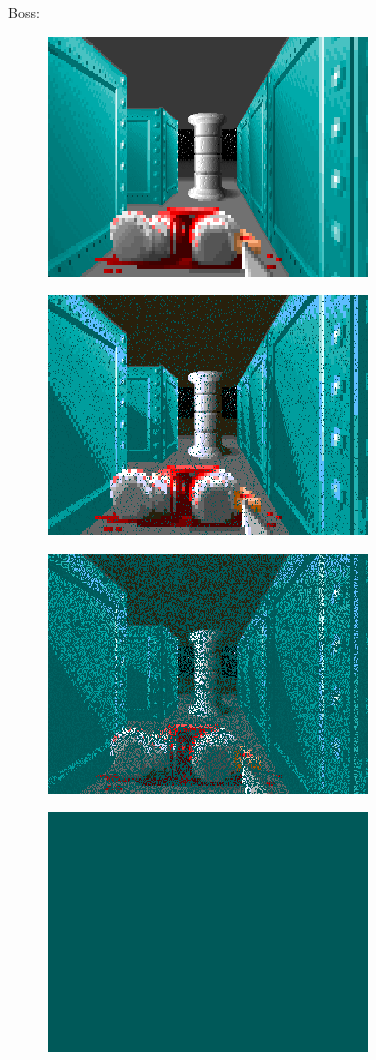 Boss:\\
\begin{figure}[H] \centering \includegraphics[scale=1.0]{imgs/fizzlefade/boss/screenshot_60.png} \end{figure}        
\begin{figure}[H] \centering \includegraphics[scale=1.0]{imgs/fizzlefade/boss/screenshot_66.png} \end{figure}        
\begin{figure}[H] \centering \includegraphics[scale=1.0]{imgs/fizzlefade/boss/screenshot_102.png} \end{figure}        
\begin{figure}[H] \centering \includegraphics[scale=1.0]{imgs/fizzlefade/boss/screenshot_130.png} \end{figure}        

